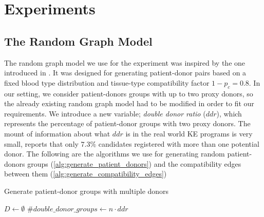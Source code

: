 \chapter{Experiments}
\label{cha:Experiments}


\section{The Random Graph Model}
The random graph model we use for the experiment was inspired by the one introduced in \cite{toulis2011random}. It was designed for generating patient-donor pairs based on a fixed blood type distribution and tissue-type compatibility factor $1 - p_c = 0.8$. In our setting, we consider patient-donors groups with up to two proxy donors, so the already existing random graph model had to be modified in order to fit our requirements. We introduce a new variable; \textit{double donor ratio} ($ddr$), which represents the percentage of patient-donor groups with two proxy donors. The mount of information about what $ddr$ is in the real world KE programs is very small, \cite{holscher2018kidney} reports that only $7.3\%$ candidates registered with more than one potential donor. The following are the algorithms we use for generating random patient-donors groups (\autoref{alg:generate_patient_donors}) and the compatibility edges between them (\autoref{alg:generate_compatibility_edges})

\begin{algorithm}
    \caption{Generate patient-donor groups with multiple donors}
    \label{alg:generate_patient_donors}


    $D \gets \emptyset$\;
    $\#double\_donor\_groups \gets n \cdot ddr$\;
\end{algorithm}


